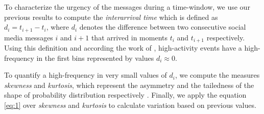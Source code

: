 \documentclass[sigconf]{acmart}
\begin{document}
To characterize the urgency of the messages during a time-window, we use our previous results \cite{DBLP:conf/fdia/Sarmiento17} to compute the \textit{interarrival time} which is defined as $d_{i} = t_{i+1} - t_{i}$, where $d_{i}$ denotes the difference between two consecutive social media messages $i$ and $i+1$ that arrived in moments $t_{i}$ and $t_{i+1}$ respectively. Using this definition and according the work of \citeauthor{kalyanam2016prediction} \cite{kalyanam2016prediction}, high-activity events have a high-frequency in the first bins represented by values $d_{i} \approx 0$. 

To quantify a high-frequency in very small values of $d_{i}$, we compute the measures \textit{skewness} and \textit{kurtosis}, which represent the asymmetry and the tailedness of the shape of probability distribution respectively \cite{mardia1970measures}. Finally, we apply the equation \ref{eq:1} over \textit{skewness} and \textit{kurtosis} to calculate variation based on previous values.


\end{document}
